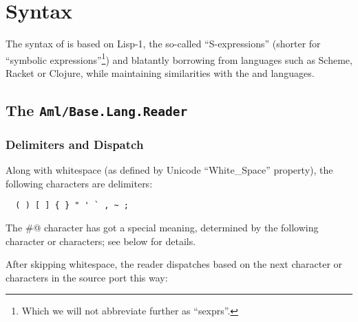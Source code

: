 
\chapter{Syntax}
\label{ch:aml-base-syntax}

The syntax of \AmlBase is based on Lisp-1, the so-called ``S-expressions'' (shorter for ``symbolic expressions''\footnote{Which we will not abbreviate further as ``sexprs''.}) and blatantly borrowing from languages such as Scheme, Racket or Clojure, while maintaining similarities with the \Aml and \AmlCore languages. 




\section[The Aml/Base.Lang.Reader]{The \lstinline!Aml/Base.Lang.Reader!}
\label{sec:aml-base-lang-reader}




\subsection{Delimiters and Dispatch}
\label{subsec:aml-base-lang-reader-delimiters-dispatch}

Along with whitespace (as defined by Unicode ``White\_Space'' property), the following characters are delimiters:

\begin{lstlisting}
  ( ) [ ] { } " ' ` , ~ ;
\end{lstlisting}

The \lstinline@#@ character has got a special meaning, determined by the following character or characters; see below for details. 

After skipping whitespace, the \AmlBase reader dispatches based on the next character or characters in the source port this way:


